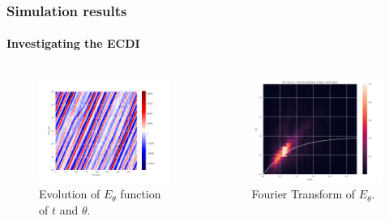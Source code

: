 \documentclass[sans, aspectratio=169]{beamer}
\begin{document}
\begin{frame} 
	\frametitle{Simulation results} 
	\framesubtitle{ Investigating the ECDI } 
	
	\begin{columns}
	
		\begin{column}{0.45\linewidth}
			\begin{figure}[hbtp]
				\centering
				\includegraphics[scale=0.24]{images/Etheta_of_t_theta.png}
				\caption{Evolution of $E_{\theta}$ function of $t$ and $\theta$.}

			\end{figure}
		

		\end{column}	

		\begin{column}{0.45\linewidth}
			\begin{figure}[hbtp]
				\centering
				\includegraphics[scale=0.22]{images/2D_FFT.png} 
				\caption{Fourier Transform of $E_{\theta}$.}
			\end{figure}
		\end{column}	
	
	\end{columns}

\end{frame}
\end{document}
